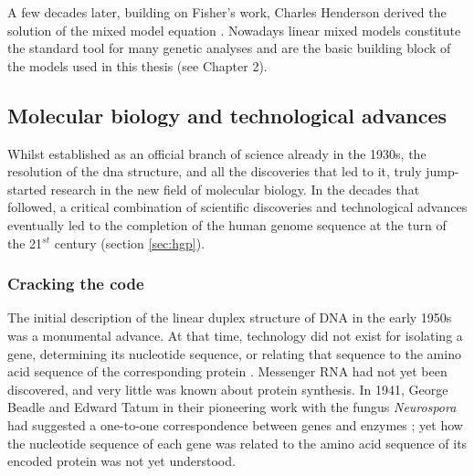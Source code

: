 A few decades later, building on Fisher’s work, Charles Henderson derived the solution of the mixed model equation \cite{henderson1950estimation}. 
Nowadays linear mixed models constitute the standard tool for many genetic analyses and are the basic building block of the models used in this thesis (see 
Chapter 2).

\newpage

\subsection{Molecular biology and technological advances}
\label{sec:genetic_timeline}

Whilst established as an official branch of science already in the 1930s, the resolution of the \gls{dna} structure, and all the discoveries that led to it, truly jump-started research in the new field of molecular biology.
In the decades that followed, a critical combination of scientific discoveries and technological advances eventually led to the completion of the human genome sequence at the turn of the 21$^{st}$ century \cite{nhgri2003genetic} (section \ref{sec:hgp}).

\subsubsection{Cracking the code}

The initial description of the linear duplex structure of DNA in the early 1950s was a monumental advance. 
At that time, technology did not exist for isolating a gene, determining its nucleotide sequence, or relating that sequence to the amino acid sequence of the corresponding protein \cite{yanofsky2007establishing}. 
Messenger RNA had not yet been discovered, and very little was known about protein synthesis. 
In 1941, George Beadle and Edward Tatum in their pioneering work with the fungus \textit{Neurospora} had suggested a one-to-one correspondence between genes and enzymes \cite{beadle1941genetic}; 
yet how the nucleotide sequence of each gene was related to the amino acid sequence of its encoded protein was not yet understood.\\

